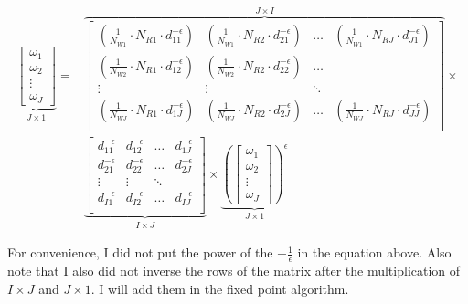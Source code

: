 \documentclass[
  11pt]{article}
\begin{document}
\begin{align*}
  \underbrace{
  \begin{bmatrix}
    \omega_1 \\
    \omega_2 \\
    \vdots \\
    \omega_J
  \end{bmatrix}}_{J \times 1}
  = &
  \overbrace{
  \begin{bmatrix}
    \left(\frac{1}{N_{W1}} \cdot N_{R1} \cdot d_{11}^{-\epsilon}\right) & \left(\frac{1}{N_{W1}} \cdot N_{R2} \cdot d_{21}^{-\epsilon}\right) & \ldots & \left(\frac{1}{N_{W1}} \cdot N_{RJ} \cdot d_{J1}^{-\epsilon}\right) \\
    \left(\frac{1}{N_{W2}} \cdot N_{R1} \cdot d_{12}^{-\epsilon}\right) & \left(\frac{1}{N_{W2}} \cdot N_{R2} \cdot d_{22}^{-\epsilon}\right) & \ldots \\
    \vdots & \vdots & \ddots \\
    \left(\frac{1}{N_{WJ}} \cdot N_{R1} \cdot d_{1J}^{-\epsilon}\right) & \left(\frac{1}{N_{WJ}} \cdot N_{R2} \cdot d_{2J}^{-\epsilon}\right) & \ldots & \left(\frac{1}{N_{WJ}} \cdot N_{RJ} \cdot d_{JJ}^{-\epsilon}\right) \\
  \end{bmatrix}}^{J \times I} \times \\ 
  &\underbrace{
  \begin{bmatrix}
    d_{11}^{-\epsilon} & d_{12}^{-\epsilon} & \ldots & d_{1J}^{-\epsilon} \\
    d_{21}^{-\epsilon} & d_{22}^{-\epsilon} & \ldots & d_{2J}^{-\epsilon} \\
    \vdots & \vdots & \ddots \\
    d_{I1}^{-\epsilon} & d_{I2}^{-\epsilon} & \ldots & d_{IJ}^{-\epsilon} \\
  \end{bmatrix}}_{I \times J} \times 
  \underbrace{
  \left(\begin{bmatrix}
    \omega_1 \\
    \omega_2 \\
    \vdots \\
    \omega_J
  \end{bmatrix}\right)^{\epsilon}}_{J \times 1}
\end{align*}

For convenience, I did not put the power of the \(-\frac{1}{\epsilon}\)
in the equation above. Also note that I also did not inverse the rows of
the matrix after the multiplication of \(I \times J\) and
\(J \times 1\). I will add them in the fixed point algorithm.
\end{document}
